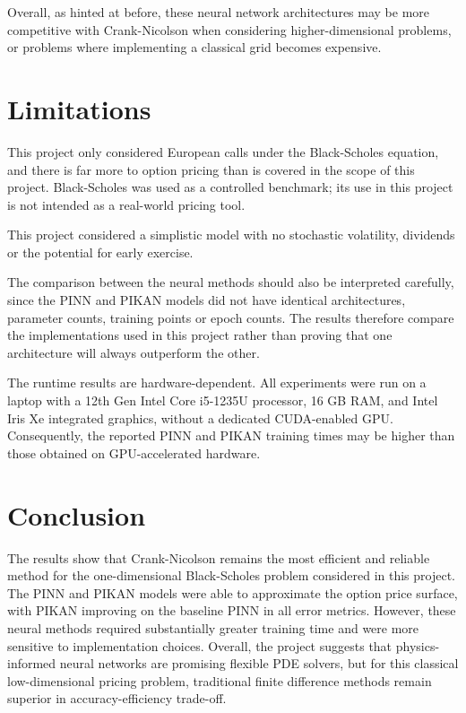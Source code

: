 \documentclass[11pt,a4paper]{article}
\begin{document}
Overall, as hinted at before, these neural network architectures may be more competitive with Crank-Nicolson when considering higher-dimensional problems, or problems where implementing a classical grid becomes expensive.

\section{Limitations}

This project only considered European calls under the Black-Scholes equation, and there is far more to option pricing than is covered in the scope of this project. Black-Scholes was used as a controlled benchmark; its use in this project is not intended as a real-world pricing tool.

This project considered a simplistic model with no stochastic volatility, dividends or the potential for early exercise.

The comparison between the neural methods should also be interpreted carefully, since the PINN and PIKAN models did not have identical architectures, parameter counts, training points or epoch counts. The results therefore compare the implementations used in this project rather than proving that one architecture will always outperform the other.

The runtime results are hardware-dependent. All experiments were run on a laptop with a 12th Gen Intel Core i5-1235U processor, 16 GB RAM, and Intel Iris Xe integrated graphics, without a dedicated CUDA-enabled GPU. Consequently, the reported PINN and PIKAN training times may be higher than those obtained on GPU-accelerated hardware.

\section{Conclusion}

The results show that Crank-Nicolson remains the most efficient and reliable method for the one-dimensional Black-Scholes problem considered in this project. The PINN and PIKAN models were able to approximate the option price surface, with PIKAN improving on the baseline PINN in all error metrics. However, these neural methods required substantially greater training time and were more sensitive to implementation choices. Overall, the project suggests that physics-informed neural networks are promising flexible PDE solvers, but for this classical low-dimensional pricing problem, traditional finite difference methods remain superior in accuracy-efficiency trade-off.
\end{document}
